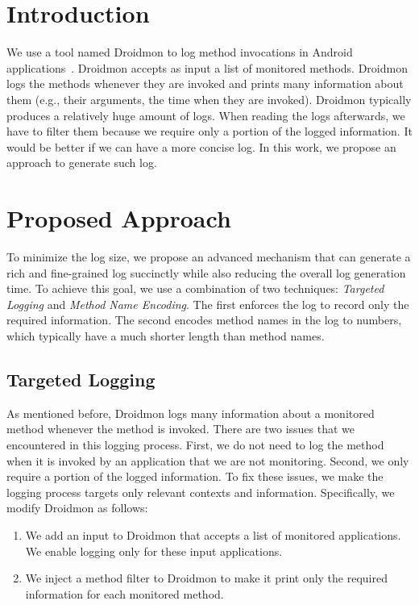 \documentclass[12pt]{article}
\date{}
\begin{document}
	
\maketitle

\section{Introduction}
We use a tool named Droidmon to log method invocations in Android applications~\cite{droidmon}. Droidmon accepts as input a list of monitored methods. Droidmon logs the methods whenever they are invoked and prints many information about them (e.g., their arguments, the time when they are invoked). Droidmon typically produces a relatively huge amount of logs. When reading the logs afterwards, we have to filter them because we require only a portion of the logged information. It would be better if we can have a more concise log. In this work, we propose an approach to generate such log.

\section{Proposed Approach}
To minimize the log size, we propose an advanced mechanism that can generate a rich and fine-grained log succinctly while also reducing the overall log generation time. To achieve this goal, we use a combination of two techniques: {\em Targeted Logging} and {\em Method Name Encoding}. The first enforces the log to record only the required information. The second encodes method names in the log to numbers, which typically have a much shorter length than method names.

\subsection{Targeted Logging}
As mentioned before, Droidmon logs many information about a monitored method whenever the method is invoked. There are two issues that we encountered in this logging process. First, we do not need to log the method when it is invoked by an application that we are not monitoring. Second, we only require a portion of the logged information. To fix these issues, we make the logging process targets only  relevant contexts and information. Specifically, we modify Droidmon as follows:

\begin{enumerate}
	\item We add an input to Droidmon that accepts a list of monitored applications. We enable logging only for these input applications.
	\item We inject a method filter to Droidmon to make it print only the required information for each monitored method.
\end{enumerate}
\end{document}
